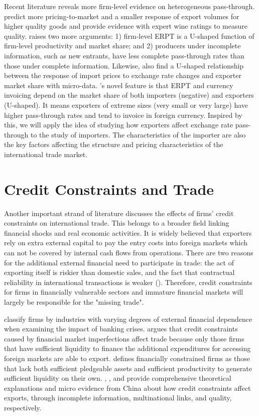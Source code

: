 Recent literature reveals more firm-level evidence on heterogeneous pass-through. \cite{chen2016} predict more pricing-to-market and a smaller response of export volumes for higher quality goods and provide evidence with expert wine ratings to measure quality. \cite{garetto2016} raises two more arguments: 1) firm-level ERPT is a U-shaped function of firm-level productivity and market share; and 2) producers under incomplete information, such as new entrants, have less complete pass-through rates than those under complete information. Likewise, \cite{auer2016} also find a U-shaped relationship between the response of import prices to exchange rate changes and exporter market share with micro-data. \cite{devereux2017}'s novel feature is that ERPT and currency invoicing depend on the market share of both importers (negative) and exporters (U-shaped). It means exporters of extreme sizes (very small or very large) have higher pass-through rates and tend to invoice in foreign currency. Inspired by this, we will apply the idea of studying how exporters affect exchange rate pass-through to the study of importers. The characteristics of the importer are also the key factors affecting the structure and pricing characteristics of the international trade market.

\section{Credit Constraints and Trade}

Another important strand of literature discusses the effects of firms' credit constraints on international trade. This belongs to a broader field linking financial shocks and real economic activities. It is widely believed that exporters rely on extra external capital to pay the entry costs into foreign markets which can not be covered by internal cash flows from operations. There are two reasons for the additional external financial need to participate in trade: the act of exporting itself is riskier than domestic sales, and the fact that contractual reliability in international transactions is weaker (\cite{chaney2016}). Therefore, credit constraints for firms in financially vulnerable sectors and immature financial markets will largely be responsible for the "missing trade".

\cite{kroszner2007} classify firms by industries with varying degrees of external financial dependence when examining the impact of banking crises. \cite{manova2013} argues that credit constraints caused by financial market imperfections affect trade because only those firms that have sufficient liquidity to finance the additional expenditures for accessing foreign markets are able to export. \cite{chaney2016} defines financially constrained firms as those that lack both sufficient pledgeable assets and sufficient productivity to generate sufficient liquidity on their own. \cite{feenstra-li-yu2014}, \cite{manova-wei-zhang2015}, and \cite{fan-lai-li2015} provide comprehensive theoretical explanations and micro evidence from China about how credit constraints affect exports, through incomplete information, multinational links, and quality, respectively.

